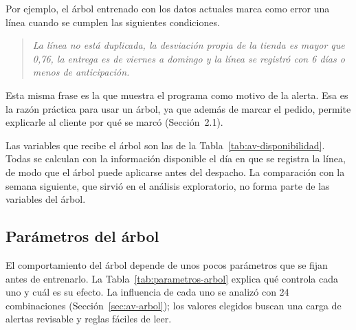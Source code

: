 Por ejemplo, el árbol entrenado con los datos actuales marca como error una línea cuando se cumplen las siguientes condiciones.

\begin{quote}
\emph{La línea no está duplicada, la desviación propia de la tienda es mayor que 0,76, la entrega es de viernes a domingo y la línea se registró con 6 días o menos de anticipación.}
\end{quote}

Esta misma frase es la que muestra el programa como motivo de la alerta. Esa es la razón práctica para usar un árbol, ya que además de marcar el pedido, permite explicarle al cliente por qué se marcó (Sección~2.1).

Las variables que recibe el árbol son las de la Tabla~\ref{tab:av-disponibilidad}. Todas se calculan con la información disponible el día en que se registra la línea, de modo que el árbol puede aplicarse antes del despacho. La comparación con la semana siguiente, que sirvió en el análisis exploratorio, no forma parte de las variables del árbol.

\subsection{Parámetros del árbol}
\label{sec:parametros}

El comportamiento del árbol depende de unos pocos parámetros que se fijan antes de entrenarlo. La Tabla~\ref{tab:parametros-arbol} explica qué controla cada uno y cuál es su efecto. La influencia de cada uno se analizó con 24 combinaciones (Sección~\ref{sec:av-arbol}); los valores elegidos buscan una carga de alertas revisable y reglas fáciles de leer.

